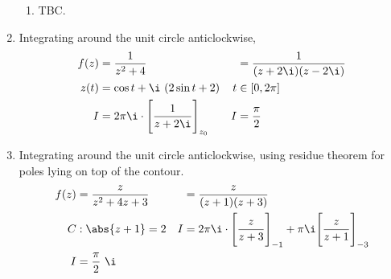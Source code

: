 \begin{enumerate}
\begin{enumerate}
              \item TBC.
          \end{enumerate}

    \item Integrating around the unit circle anticlockwise,
          \begin{align}
              f(z) & = \frac{1}{z^2 + 4}                                   &
                   & = \frac{1}{(z + 2\i)(z - 2\i)}                          \\
              z(t) & = \cos t + \i\ (2\sin t + 2)                          &
              t    & \in [0, 2\pi]                                           \\
              I    & = 2\pi \i \cdot \Bigg[ \frac{1}{z + 2\i} \Bigg]_{z_0} &
              I    & = \frac{\pi}{2}
          \end{align}

    \item Integrating around the unit circle anticlockwise, using residue theorem for
          poles lying on top of the contour.
          \begin{align}
              f(z) & = \frac{z}{z^2 + 4z + 3}                           &
                   & = \frac{z}{(z + 1)(z+3)}                             \\
              C    & : \abs{z + 1} = 2                                  &
              I    & = 2\pi \i \cdot \Bigg[ \frac{z}{z + 3} \Bigg]_{-1}
              + \pi \i \Bigg[ \frac{z}{z+1} \Bigg]_{-3}                   \\
              I    & = \frac{\pi}{2}\ \i
          \end{align}


\end{enumerate}
